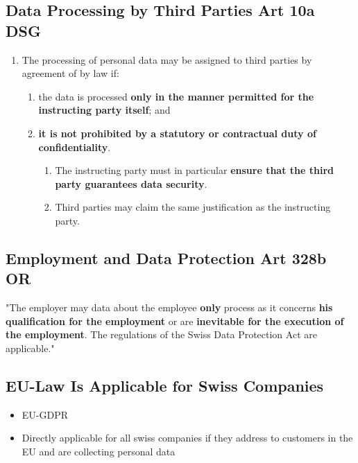 \documentclass[11pt]{article}
\theoremstyle{definition}
\begin{document}
\subsection{Data Processing by Third Parties Art 10a DSG}
\begin{enumerate}[label=\arabic*]
	\item The processing of personal data may be assigned to third parties by agreement of by law if:
	\begin{enumerate}[label=\alph*.]
		\item the data is processed \textbf{only in the manner permitted for the instructing party itself}; and
		\item \textbf{it is not prohibited by a statutory or contractual duty of confidentiality}.
		\begin{enumerate}[label=\arabic*.]
			\item The instructing party must in particular \textbf{ensure that the third party guarantees data security}.
			\item Third parties may claim the same justification as the instructing party.
		\end{enumerate}
	\end{enumerate}
\end{enumerate}

\subsection{Employment and Data Protection Art 328b OR}
"The employer may data about the employee \textbf{only} process as it concerns \textbf{his qualification for the employment} or are \textbf{inevitable for the execution of the employment}. The regulations of the Swiss Data Protection Act are applicable."

\subsection{EU-Law Is Applicable for Swiss Companies}

\begin{itemize}
	\item EU-GDPR
	\item Directly applicable for all swiss companies if they address to customers in the EU  and are collecting personal data
\end{itemize}
\end{document}
